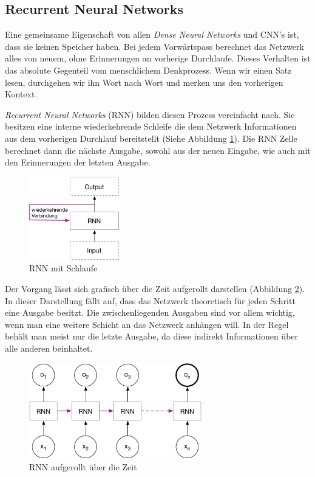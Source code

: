 \subsection{Recurrent Neural Networks}
Eine gemeinsame Eigenschaft von allen \textit{Dense Neural Networks} und CNN's ist, dass sie keinen Speicher haben. Bei jedem Vorwärtspass berechnet das Netzwerk alles von neuem, ohne Erinnerungen an vorherige Durchlaufe. Dieses Verhalten ist das absolute Gegenteil vom menschlichem Denkprozess. Wenn wir einen Satz lesen, durchgehen wir ihn Wort nach Wort und merken uns den vorherigen Kontext.

\textit{Recurrent Neural Networks} (RNN) bilden diesen Prozess vereinfacht nach. Sie besitzen eine interne wiederkehrende Schleife die dem Netzwerk Informationen aus dem vorherigen Durchlauf bereitstellt (Siehe Abbildung \ref{img:rnn_loop}). Die RNN Zelle berechnet dann die nächste Ausgabe, sowohl aus der neuen Eingabe, wie auch mit den Erinnerungen der letzten Ausgabe. \parencite{chollet}\\
\begin{figure}[hbt]
	\centering
		\includegraphics[width=0.35\textwidth]{assets/rnn_loop.png}
	\caption{RNN mit Schlaufe}
	\label{img:rnn_loop}
\end{figure}

Der Vorgang lässt sich grafisch über die Zeit aufgerollt darstellen (Abbildung \ref{img:rnn_unrolled}). In dieser Darstellung fällt auf, dass das Netzwerk theoretisch für jeden Schritt eine Ausgabe besitzt. Die zwischenliegenden Ausgaben sind vor allem wichtig, wenn man eine weitere Schicht an das Netzwerk anhängen will. In der Regel behält man meist nur die letzte Ausgabe, da diese indirekt Informationen über alle anderen beinhaltet.\\
\begin{figure}[hbt]
	\centering
		\includegraphics[width=0.67\textwidth]{assets/rnn_unrolled.png}
	\caption{RNN aufgerollt über die Zeit}
	\label{img:rnn_unrolled}
\end{figure}

